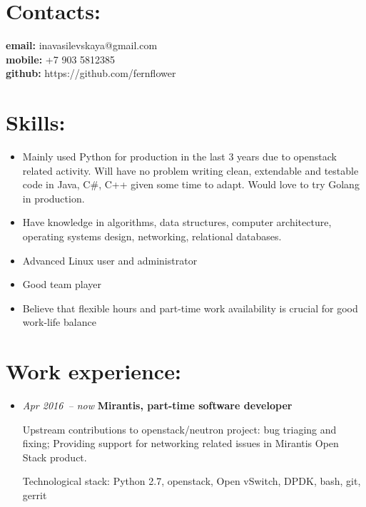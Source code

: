 \documentclass{res}
\begin{document}
    \begin{resume}
        \section{Contacts:}
        {\bf email:} inavasilevskaya@gmail.com \\
        {\bf mobile:} +7 903 5812385\\
        {\bf github:} https://github.com/fernflower\\
        \section{Skills:}
        \begin{itemize}
            \item Mainly used Python for production in the last 3 years due to openstack related activity. Will have no problem writing clean, extendable and testable code in
                Java, C\#, C++ given some time to adapt. Would love to try Golang in production.

            \item Have knowledge in algorithms, data structures, computer architecture, operating systems design, networking, relational databases.

            \item Advanced Linux user and administrator

            \item Good team player

            \item Believe that flexible hours and part-time work availability is crucial for good work-life balance

        \end{itemize}

        \section{Work experience:}
        \begin{itemize}
            \item \textit{Apr 2016~-- now}
                \textbf{Mirantis, part-time software developer}

                Upstream contributions to openstack/neutron project: bug triaging and fixing; Providing support for networking related issues in Mirantis Open Stack product.

                Technological stack: Python 2.7, openstack, Open vSwitch, DPDK, bash, git, gerrit


\end{itemize}
\end{resume}
\end{document}
